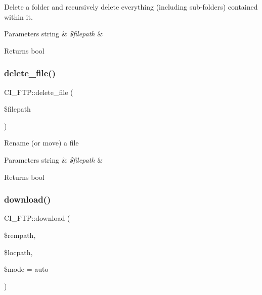 Delete a folder and recursively delete everything (including sub-\/folders) contained within it.


\begin{DoxyParams}[1]{Parameters}
string & {\em \$filepath} & \\
\hline
\end{DoxyParams}
\begin{DoxyReturn}{Returns}
bool 
\end{DoxyReturn}
\mbox{\label{class_c_i___f_t_p_a145d886c73fc1915975e715b9cf57eb9}} 
\subsubsection{\texorpdfstring{delete\+\_\+file()}{delete\_file()}}
{\footnotesize\ttfamily C\+I\+\_\+\+F\+T\+P\+::delete\+\_\+file (\begin{DoxyParamCaption}\item[{}]{\$filepath }\end{DoxyParamCaption})}

Rename (or move) a file


\begin{DoxyParams}[1]{Parameters}
string & {\em \$filepath} & \\
\hline
\end{DoxyParams}
\begin{DoxyReturn}{Returns}
bool 
\end{DoxyReturn}
\mbox{\label{class_c_i___f_t_p_abafde05766c43c3687d625028eee8d15}} 
\subsubsection{\texorpdfstring{download()}{download()}}
{\footnotesize\ttfamily C\+I\+\_\+\+F\+T\+P\+::download (\begin{DoxyParamCaption}\item[{}]{\$rempath,  }\item[{}]{\$locpath,  }\item[{}]{\$mode = {\ttfamily \textquotesingle{}auto\textquotesingle{}} }\end{DoxyParamCaption})}

